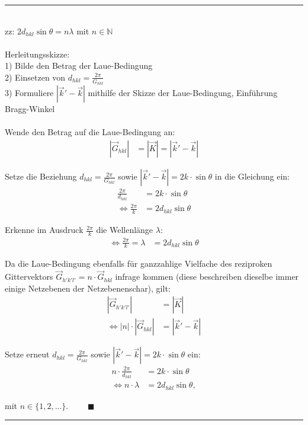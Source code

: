 \documentclass{article}
\begin{document}
{\color{violet}
\hrule
	\\
	zz: $2 d_{hkl} \sin\theta =n \lambda$ mit $n\in\mathbb{N}$\\
	\\
	Herleitungsskizze:\\
	1) Bilde den Betrag der Laue-Bedingung\\
	2) Einsetzen von $d_{hkl} = \frac{2\pi}{G_{hkl}}$\\
	3) Formuliere $|\vec{k}'-\vec{k}|$ mithilfe der Skizze der Laue-Bedingung, Einführung Bragg-Winkel\\
	\\
	Wende den Betrag auf die Laue-Bedingung an:
		\begin{align*}
			|\vec{G}_{hkl}| &= |\vec{K}| = |\vec{k}'-\vec{k}|
		\end{align*}
	
	Setze die Beziehung $d_{hkl} = \frac{2\pi}{G_{hkl}}$ sowie $|\vec{k}' - \vec{k}| = 2k \cdot \sin\theta$ in die Gleichung ein:
		\begin{align*}
			\frac{2\pi}{d_{hkl}} &= 2k \cdot \sin\theta \\
			\Leftrightarrow \frac{2\pi}{k} &= 2 d_{hkl} \sin\theta
		\end{align*}

	Erkenne im Ausdruck $\frac{2\pi}{k}$ die Wellenlänge $\lambda$:
		\begin{align*}
			\Leftrightarrow \frac{2\pi}{k} = \lambda &= 2d_{hkl} \sin\theta
		\end{align*}
	
	Da die Laue-Bedingung ebenfalls für ganzzahlige Vielfache des reziproken Gittervektors $\vec{G}_{h'k'l'} = n \cdot \vec{G}_{hkl}$ infrage kommen (diese beschreiben dieselbe immer einige Netzebenen der Netzebenenschar), gilt:
		\begin{align*}
			|\vec{G}_{h'k'l'}| &= |\vec{K}| \\
			\Leftrightarrow |n| \cdot |\vec{G}_{hkl}| &= |\vec{k}' - \vec{k}|
		\end{align*}
	
	Setze erneut $d_{hkl} = \frac{2\pi}{G_{hkl}}$ sowie $|\vec{k}' - \vec{k}| = 2k \cdot \sin\theta$ ein:
		\begin{align*}
			n \cdot \frac{2\pi}{d_{hkl}} &= 2k \cdot \sin\theta \\
			\Leftrightarrow n \cdot \lambda &= 2 d_{hkl} \sin\theta,
		\end{align*}
	
	mit $n \in \{1, 2, ...\}$. $\qquad \blacksquare$
\hrule
}
\end{document}
